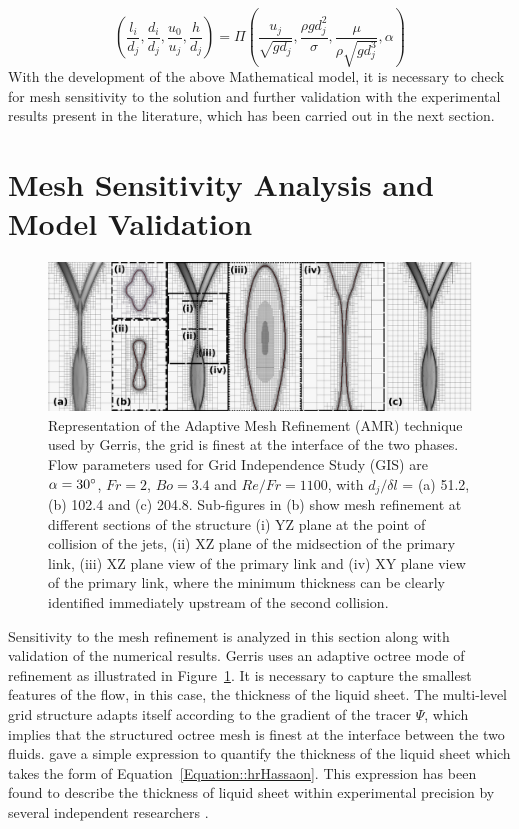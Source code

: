 \documentclass[%
aip,
sd,%
amsmath,amssymb,
preprint,%
author-year,%
]{revtex4-1}
\begin{document}
\begin{equation}\label{Equation::Pi}
\left(\frac{l_i}{d_j},\frac{d_i}{d_j},\frac{u_0}{u_j},\frac{h}{d_j}\right) = \Pi\left(\frac{u_j}{\sqrt{gd_j}},\frac{\rho gd_j^2}{\sigma},\frac{\mu}{\rho\sqrt{gd_j^3}},\alpha\right)
\end{equation}
With the development of the above Mathematical model, it is necessary to check for mesh sensitivity to the solution and further validation with the experimental results present in the literature, which has been carried out in the next section.

\section{ Mesh Sensitivity Analysis and Model Validation}\label{section::valid}
\begin{figure}
	\centering
	\includegraphics[width=\linewidth]{figGIS}
	\caption{Representation of the Adaptive Mesh Refinement (AMR) technique used by Gerris, the grid is finest at the interface of the two phases. Flow parameters used for Grid Independence Study (GIS) are $\alpha = 30\degree$, $Fr = 2$, $Bo = 3.4$ and $Re/Fr = 1100$, with $d_j/\delta l$ = (a) 51.2,(b) 102.4 and (c) 204.8. Sub-figures in (b) show mesh refinement at different sections of the structure (i) YZ plane at the point of collision of the jets, (ii) XZ plane of the midsection of the primary link, (iii) XZ plane view of the primary link and (iv) XY plane view of the primary link, where the minimum thickness can be clearly identified immediately upstream of the second collision.}
	\label{Figure::GISfigures}
\end{figure}
Sensitivity to the mesh refinement is analyzed in this section along with validation of the numerical results. Gerris uses an adaptive octree mode of refinement as illustrated in Figure~\ref{Figure::GISfigures}. It is necessary to capture the smallest features of the flow, in this case, the thickness of the liquid sheet. The multi-level grid structure adapts itself according to the gradient of the tracer $\Psi$, which implies that the structured octree mesh is finest at the interface between the two fluids. \cite{hasson1964thickness} gave a simple expression to quantify the thickness of the liquid sheet which takes the form of Equation~\ref{Equation::hrHassaon}. This expression has been found to describe the thickness of liquid sheet within experimental precision by several independent researchers \citep{poulikakos1998thickness,choo2001parametric,ekimova2015liquid}.
\end{document}
